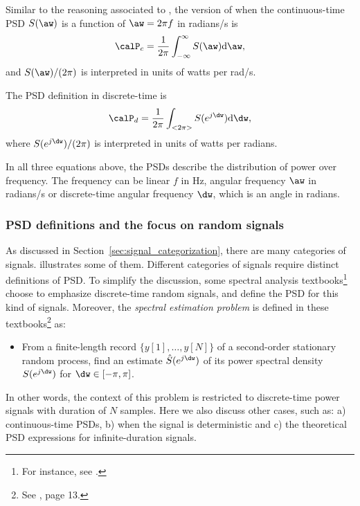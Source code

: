 Similar to the reasoning associated to , the version of  when the continuous-time PSD $S(\aw)$ is a function of $\aw = 2 \pi f$ in radians/s is
\begin{equation}
\calP_c = \frac{1}{2\pi} \int_{- \infty}^\infty S(\aw) \textrm{d}\aw,
\label{eq:psd_integration_continuousTime_rads}
\end{equation}
and $S(\aw)/(2 \pi)$ is interpreted in units of watts per rad/s.

The PSD definition in discrete-time is
\begin{equation}
\calP_d = \frac{1}{2 \pi}\int_{<2 \pi>} S(e^{j \dw}) \textrm{d}\dw,
\label{eq:psd_integration}
\end{equation}
where $S(e^{j \dw})/(2 \pi)$ is interpreted in units of watts per radians.


In all three equations above, the PSDs describe the distribution of power over frequency. The frequency can be linear $f$ in Hz, angular frequency $\aw$ 
in radians/s or discrete-time angular frequency $\dw$, which is an angle in radians.



\subsubsection{PSD definitions and the focus on random signals}
As discussed in Section~\ref{sec:signal_categorization}, there are many categories of signals.
 illustrates some of them.
Different categories of signals require distinct definitions of PSD.
To simplify the discussion, some spectral analysis textbooks\footnote{For instance, see \cite{Hayes2009,Stoica05}.} choose to emphasize discrete-time random signals, 
and define the PSD for this kind of signals.
Moreover, the \emph{spectral estimation problem} is defined in these textbooks\footnote{See \cite{Stoica05}, page 13.} as:
\begin{itemize}
\item From a finite-length record $\{y[1], \ldots, y[N] \}$ of a second-order stationary random
process, find an estimate $\hat S(e^{j \dw})$ of its power spectral density $S(e^{j \dw})$ for $\dw \in [-\pi, \pi]$.
\end{itemize}
In other words, the context of this problem is restricted to discrete-time power signals with duration of $N$ samples.
Here we also discuss other cases, such as: a) continuous-time PSDs, b) when the signal is deterministic
and c) the theoretical PSD expressions for infinite-duration signals.

